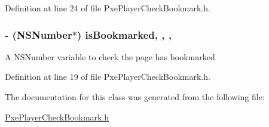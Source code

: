 Definition at line 24 of file Pxe\-Player\-Check\-Bookmark.\-h.

\hypertarget{interface_pxe_player_check_bookmark_ade2afff8924a07e7d9cc94208f19cc50}{
\subsubsection[{is\-Bookmarked}]{\setlength{\rightskip}{0pt plus 5cm}-\/ (N\-S\-Number$\ast$) is\-Bookmarked\hspace{0.3cm}{\ttfamily [read]}, {\ttfamily [write]}, {\ttfamily [nonatomic]}, {\ttfamily [strong]}}}\label{interface_pxe_player_check_bookmark_ade2afff8924a07e7d9cc94208f19cc50}
A N\-S\-Number variable to check the page has bookmarked 

Definition at line 19 of file Pxe\-Player\-Check\-Bookmark.\-h.



The documentation for this class was generated from the following file\-:\begin{DoxyCompactItemize}
\item 
\hyperlink{_pxe_player_check_bookmark_8h}{Pxe\-Player\-Check\-Bookmark.\-h}\end{DoxyCompactItemize}
